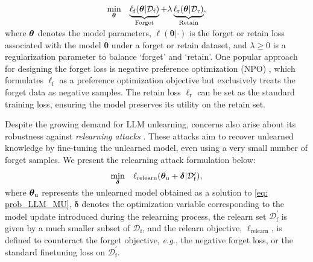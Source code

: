 \begin{align}
\begin{array}{ll}
 \displaystyle \min_{\boldsymbol{\theta}}    &  \underbrace{ \ell_{\mathrm{f}}(\boldsymbol{\theta} | \mathcal{D}_\mathrm{f}) }_\text{Forget} + \lambda \underbrace{   \ell_\mathrm{r}(  \boldsymbol{\theta} |\mathcal{D}_{\mathrm{r}} )  }_\text{Retain}, 
 \vspace*{-2mm}
\end{array}
\label{eq: prob_LLM_MU}
\end{align}
where ${\boldsymbol{\theta}}$ denotes the model parameters, 
$\ell( \boldsymbol{\theta} | \cdot )$ is the forget or retain loss associated with the model $\boldsymbol{\theta}$ under a forget or retain dataset, and $\lambda \geq 0$ is a regularization parameter to balance `forget'   and `retain’. One popular approach for designing the forget loss is negative preference optimization (NPO) \citep{zhang2024negative}, which formulates $\ell_{\mathrm{f}}$ as a preference optimization objective \citep{rafailov2024direct} but exclusively treats the forget data as negative samples. The retain loss $\ell_{\mathrm{r}}$ can be set as the standard training loss, ensuring the model preserves its utility on the retain set.

Despite the growing demand for LLM unlearning, concerns also arise about its robustness against \textit{relearning attacks} \citep{hu2024jogging}. These attacks aim to recover unlearned knowledge by fine-tuning the unlearned model, even using a very small number of forget samples.
We present the relearning attack formulation below:
\vspace*{-2mm}
\begin{align}
\begin{array}{ll}
    \displaystyle   \min_{\boldsymbol{\delta}} 
  &   \ell_{\mathrm{relearn}} (\btheta_{\mathrm{u}} + \boldsymbol{\delta} |   \mathcal{D}_{\mathrm{f}}^\prime ),
  \vspace*{-2mm}
\end{array}
\label{eq: relearn_atk}
\end{align}
where ${\boldsymbol{\theta}}_{\mathrm{u}}$ represents the unlearned model obtained as a solution to \eqref{eq: prob_LLM_MU},  $\boldsymbol{\delta}$ denotes the optimization variable corresponding to the model update introduced during the relearning process,   the relearn set $\mathcal{D}_{\mathrm{f}}^\prime$ is given by a much smaller subset of $\mathcal{D}_{\mathrm{f}}$, and
the relearn objective, $ \ell_{\mathrm{relearn}} $, is defined to counteract the forget objective, \textit{e.g.}, the negative forget loss, or the standard finetuning loss on $\mathcal{D}_{\mathrm{f}}^\prime$. 



